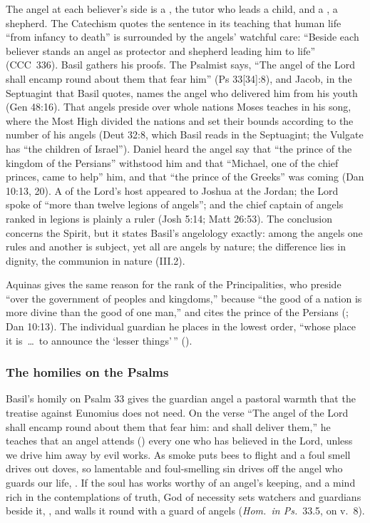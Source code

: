 The angel at each believer's side is a , the
tutor who leads a child, and a , a shepherd. The Catechism
quotes the sentence in its teaching that human life ``from infancy to
death'' is surrounded by the angels' watchful care: ``Beside each believer
stands an angel as protector and shepherd leading him to life'' (CCC~336).
Basil gathers his proofs. The Psalmist says, ``The angel of the Lord shall
encamp round about them that fear him'' (Ps 33[34]:8), and Jacob, in the
Septuagint that Basil quotes, names the angel who delivered him from his
youth (Gen 48:16). That angels preside over whole nations Moses teaches
in his song, where the Most High divided the nations and set their bounds
according to the number of his angels (Deut 32:8, which Basil reads in the
Septuagint; the Vulgate has ``the children of Israel''). Daniel heard
the angel say that ``the prince of the kingdom of the Persians'' withstood
him and that ``Michael, one of the chief princes, came to help'' him, and
that ``the prince of the Greeks'' was coming (Dan 10:13, 20). A
 of the Lord's host appeared to Joshua at the
Jordan; the Lord spoke of ``more than twelve legions of angels''; and the
chief captain of angels ranked in legions is plainly a ruler (Josh
5:14; Matt 26:53). The conclusion concerns the Spirit, but it states
Basil's angelology exactly: among the angels one rules and another is
subject, yet all are angels by nature; the difference lies in dignity, the
communion in nature (III.2).

Aquinas gives the same reason for the rank of the Principalities, who
preside ``over the government of peoples and kingdoms,'' because ``the
good of a nation is more divine than the good of one man,'' and cites the
prince of the Persians (; Dan 10:13). The individual
guardian he places in the lowest order, ``whose place it is~\dots\ to
announce the `lesser things'\,'' ().

\subsubsection{The homilies on the Psalms}

Basil's homily on Psalm 33 gives the guardian angel a pastoral warmth
that the treatise against Eunomius does not need. On the verse ``The
angel of the Lord shall encamp round about them that fear him: and shall
deliver them,'' he teaches that an angel attends () every
one who has believed in the Lord, unless we drive him away by evil works.
As smoke puts bees to flight and a foul smell drives out doves, so
lamentable and foul-smelling sin drives off the angel who guards our life,
. If the soul has works
worthy of an angel's keeping, and a mind rich in the contemplations of
truth, God of necessity sets watchers and guardians beside it,
, and walls it round with a guard of angels
(\emph{Hom.\ in Ps.}\ 33.5, on v.~8).

